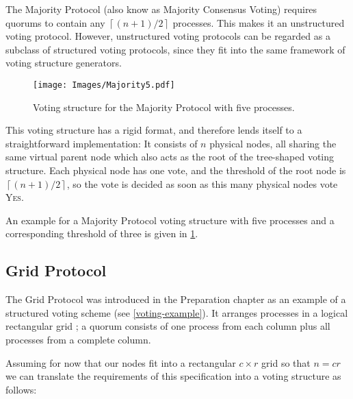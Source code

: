 \documentclass[12pt,chapterprefix=true,toc=bibliography,numbers=noendperiod,
               footnotes=multiple,twoside]{scrreprt}
\newcommand{\yes}{{\fontfamily{jkposn}\selectfont\textsc{Yes}}}
\begin{document}
The Majority Protocol (also know as Majority Consensus Voting\autocite{majority}) requires quorums to contain any \(\left\lceil (n + 1) / 2 \right\rceil\) processes. This makes it an unstructured voting protocol. However, unstructured voting protocols can be regarded as a subclass of structured voting protocols, since they fit into the same framework of voting structure generators.

\begin{figure}[h]
    \centering
    \texttt{[image: Images/Majority5.pdf]}
    \caption{Voting structure for the Majority Protocol with five processes.}
    \label{fig:majority5-struct}
\end{figure}

This voting structure has a rigid format, and therefore lends itself to a straightforward implementation: It consists of \(n\) physical nodes, all sharing the same virtual parent node which also acts as the root of the tree-shaped voting structure. Each physical node has one vote, and the threshold of the root node is \(\left\lceil (n + 1) / 2 \right\rceil\), so the vote is decided as soon as this many physical nodes vote \yes.

An example for a Majority Protocol voting structure with five processes and a corresponding threshold of three is given in \cref{fig:majority5-struct}.

\subsection{Grid Protocol}
\label{ssc:grid}

The Grid Protocol was introduced in the Preparation chapter as an example of a structured voting scheme (see \cref{voting-example}). It arranges processes in a logical rectangular grid \autocite{grid}; a quorum consists of one process from each column plus all processes from a complete column.

Assuming for now that our nodes fit into a rectangular \(c \times r\) grid so that \(n = c r\) we can translate the requirements of this specification into a voting structure as follows:
\end{document}
